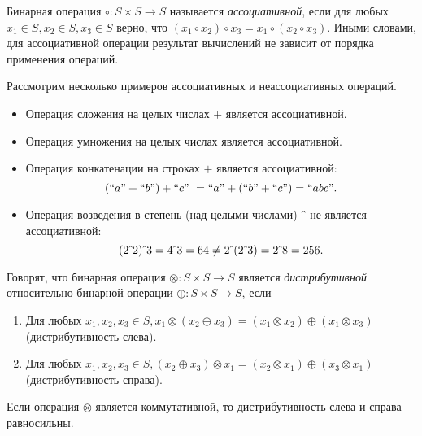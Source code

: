 \begin{definition}
Бинарная операция $\circ : S \times S \to S$ называется \emph{ассоциативной}, если для любых  $x_1 \in S, x_2 \in S, x_3 \in S$ верно, что  $(x_1 \circ x_2) \circ x_3 = x_1 \circ (x_2 \circ x_3)$. Иными словами, для ассоциативной операции результат вычислений не зависит от порядка применения операций.
\end{definition}

\begin{example} Рассмотрим несколько примеров ассоциативных и неассоциативных операций.
	\begin{itemize}
		\item Операция сложения на целых числах $+$ является ассоциативной.
		\item Операция умножения на целых числах является ассоциативной.
		\item Операция конкатенации на строках $+$ является ассоциативной: $$(``a" + ``b") + ``c" \ = ``a" + (``b" + ``c") = ``abc" .$$
		\item Операция возведения в степень (над целыми числами) $\hat{\mkern6mu}$ не является ассоциативной:
		$$(2\hat{\mkern6mu}2)\hat{\mkern6mu}3 = 4 \hat{\mkern6mu} 3 = 64 \neq 2\hat{\mkern6mu}(2\hat{\mkern6mu}3) = 2 \hat{\mkern6mu} 8  = 256.$$
	\end{itemize}
\end{example}


\begin{definition}
Говорят, что бинарная операция $\otimes : S \times S \to S$ является \emph{дистрибутивной} относительно бинарной операции $\oplus : S \times S \to S$, если
\begin{enumerate}
	\item Для любых $x_1,x_2,x_3 \in S, x_1 \otimes (x_2 \oplus x_3) = (x_1 \otimes x_2) \oplus (x_1 \otimes x_3)$ (дистрибутивность слева).
	\item Для любых $x_1,x_2,x_3 \in S, (x_2 \oplus x_3) \otimes x_1 = (x_2 \otimes x_1) \oplus (x_3 \otimes x_1)$ (дистрибутивность справа).
\end{enumerate}

Если операция $\otimes$ является коммутативной, то дистрибутивность слева и справа равносильны.

\end{definition}

